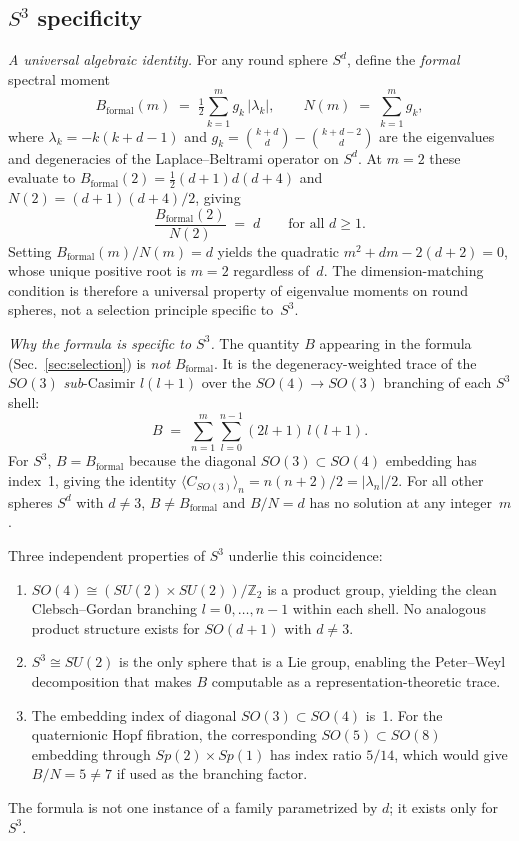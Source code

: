 \documentclass[aps,prl,twocolumn,superscriptaddress]{revtex4-2}
\begin{document}
\subsection{$S^3$ specificity}\label{sec:s3_specificity}

\textit{A universal algebraic identity.}
For any round sphere $S^d$, define the \textit{formal} spectral moment
\begin{equation}\label{eq:B_formal}
  B_{\mathrm{formal}}(m) \;=\;
  \tfrac{1}{2}\sum_{k=1}^{m} g_k\,|\lambda_k|,
  \qquad
  N(m) \;=\; \sum_{k=1}^{m} g_k,
\end{equation}
where $\lambda_k = -k(k+d-1)$ and
$g_k = \binom{k+d}{d} - \binom{k+d-2}{d}$ are the eigenvalues and
degeneracies of the Laplace--Beltrami operator on $S^d$. At $m = 2$
these evaluate to $B_{\mathrm{formal}}(2) = \tfrac{1}{2}(d+1)d(d+4)$
and $N(2) = (d+1)(d+4)/2$, giving
\begin{equation}\label{eq:universal_identity}
  \frac{B_{\mathrm{formal}}(2)}{N(2)} \;=\; d
  \qquad\text{for all } d \geq 1.
\end{equation}
Setting $B_{\mathrm{formal}}(m)/N(m) = d$ yields the quadratic
$m^2 + dm - 2(d+2) = 0$, whose unique positive root is $m = 2$
regardless of~$d$. The dimension-matching condition is therefore a
universal property of eigenvalue moments on round spheres, not a
selection principle specific to~$S^3$.

\textit{Why the formula is specific to $S^3$.}
The quantity $B$ appearing in the formula (Sec.~\ref{sec:selection})
is \textit{not} $B_{\mathrm{formal}}$. It is the
degeneracy-weighted trace of the $SO(3)$ \textit{sub}-Casimir
$l(l+1)$ over the $SO(4) \to SO(3)$ branching of each $S^3$ shell:
\begin{equation}\label{eq:B_branch}
  B \;=\; \sum_{n=1}^{m}\sum_{l=0}^{n-1}(2l+1)\,l(l+1).
\end{equation}
For $S^3$, $B = B_{\mathrm{formal}}$ because the diagonal
$SO(3) \subset SO(4)$ embedding has index~1, giving the identity
$\langle C_{SO(3)}\rangle_n = n(n+2)/2 = |\lambda_n|/2$. For all
other spheres $S^d$ with $d \neq 3$, $B \neq B_{\mathrm{formal}}$
and $B/N = d$ has no solution at any integer~$m$.

Three independent properties of $S^3$ underlie this coincidence:
\begin{enumerate}
\item $SO(4) \cong (SU(2) \times SU(2))/\mathbb{Z}_2$ is a product
  group, yielding the clean Clebsch--Gordan branching
  $l = 0, \ldots, n{-}1$ within each shell. No analogous product
  structure exists for $SO(d{+}1)$ with $d \neq 3$.
\item $S^3 \cong SU(2)$ is the only sphere that is a Lie group,
  enabling the Peter--Weyl decomposition that makes $B$ computable
  as a representation-theoretic trace.
\item The embedding index of diagonal $SO(3) \subset SO(4)$ is~1.
  For the quaternionic Hopf fibration, the corresponding
  $SO(5) \subset SO(8)$ embedding through $Sp(2) \times Sp(1)$ has
  index ratio $5/14$, which would give $B/N = 5 \neq 7$ if used as
  the branching factor.
\end{enumerate}
The formula is not one instance of a family parametrized by $d$; it
exists only for~$S^3$.
\end{document}
